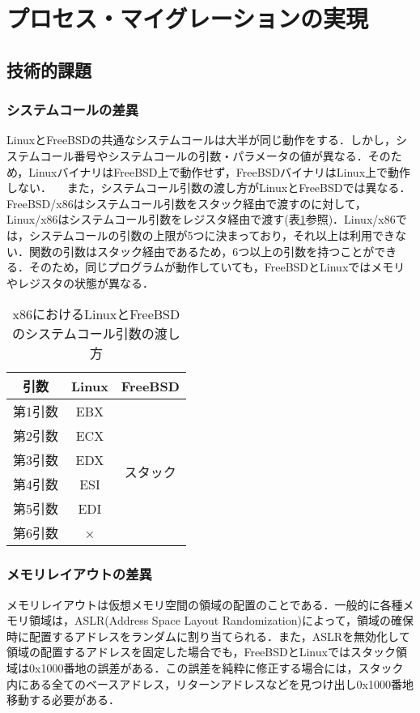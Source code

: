 \documentclass[11pt]{jarticle}
\begin{document}
\section{プロセス・マイグレーションの実現}
\label{sec:PM}
\subsection{技術的課題}
\subsubsection{システムコールの差異}
LinuxとFreeBSDの共通なシステムコールは大半が同じ動作をする．しかし，システムコール番号やシステムコールの引数・パラメータの値が異なる．そのため，LinuxバイナリはFreeBSD上で動作せず，FreeBSDバイナリはLinux上で動作しない．
　また，システムコール引数の渡し方がLinuxとFreeBSDでは異なる．FreeBSD/x86はシステムコール引数をスタック経由で渡すのに対して，Linux/x86はシステムコール引数をレジスタ経由で渡す(表\ref{tb:argument}参照)．Linux/x86では，システムコールの引数の上限が5つに決まっており，それ以上は利用できない．関数の引数はスタック経由であるため，6つ以上の引数を持つことができる．そのため，同じプログラムが動作していても，FreeBSDとLinuxではメモリやレジスタの状態が異なる．

\begin{table}
  \caption{x86におけるLinuxとFreeBSDのシステムコール引数の渡し方}
  \label{tb:argument}
  \begin{center}
  \begin{tabular}{|c|c|c|} \hline
    引数 & Linux & FreeBSD \\ \hline \hline
    第1引数 & EBX &\multirow{6}{*}{スタック}   \\ \cline{1-2}
    第2引数 & ECX &  \\ \cline{1-2}
    第3引数 & EDX &  \\ \cline{1-2}
    第4引数 & ESI & \\ \cline{1-2}
    第5引数 & EDI &  \\ \cline{1-2}
    第6引数 & × &  \\ \hline
  \end{tabular}
\end{center}
\end{table}

\subsubsection{メモリレイアウトの差異}
メモリレイアウトは仮想メモリ空間の領域の配置のことである．一般的に各種メモリ領域は，ASLR(Address Space Layout Randomization)によって，領域の確保時に配置するアドレスをランダムに割り当てられる．また，ASLRを無効化して領域の配置するアドレスを固定した場合でも，FreeBSDとLinuxではスタック領域は0x1000番地の誤差がある．この誤差を純粋に修正する場合には，スタック内にある全てのベースアドレス，リターンアドレスなどを見つけ出し0x1000番地移動する必要がある．
\end{document}
